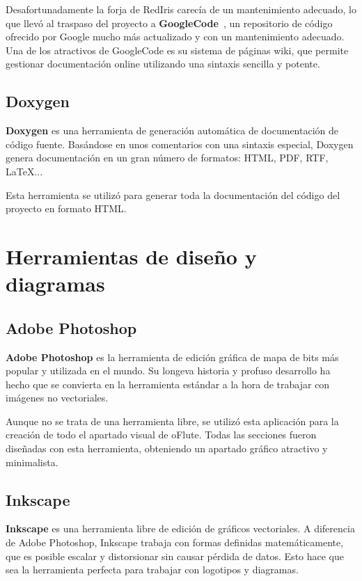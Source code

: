 Desafortunadamente la forja de RedIris carecía de un mantenimiento adecuado, lo
que llevó al traspaso del proyecto a \textbf{GoogleCode}~\cite{ofluteforja}, un
repositorio de código ofrecido por Google mucho más actualizado y con un
mantenimiento adecuado. Una de los atractivos de GoogleCode es su sistema de
páginas wiki, que permite gestionar documentación online utilizando una sintaxis
sencilla y potente.

\subsection{Doxygen}
\textbf{Doxygen} es una herramienta de generación automática de documentación de
código fuente. Basándose en unos comentarios con una sintaxis especial, Doxygen
genera documentación en un gran número de formatos: HTML, PDF, RTF, \LaTeX...

Esta herramienta se utilizó para generar toda la documentación del código del
proyecto en formato HTML.


\section{Herramientas de diseño y diagramas}

\subsection{Adobe Photoshop}
\textbf{Adobe Photoshop} es la herramienta de edición gráfica de mapa de bits
más popular y utilizada en el mundo. Su longeva historia y profuso desarrollo ha
hecho que se convierta en la herramienta estándar a la hora de trabajar con
imágenes no vectoriales.

Aunque no se trata de una herramienta libre, se utilizó esta aplicación para la
creación de todo el apartado visual de oFlute. Todas las secciones fueron
diseñadas con esta herramienta, obteniendo un apartado gráfico atractivo y
minimalista.

\subsection{Inkscape}
\textbf{Inkscape} es una herramienta libre de edición de gráficos vectoriales. A
diferencia de Adobe Photoshop, Inkscape trabaja con formas definidas
matemáticamente, que es posible escalar y distorsionar sin causar pérdida de
datos. Esto hace que sea la herramienta perfecta para trabajar con logotipos y
diagramas.


